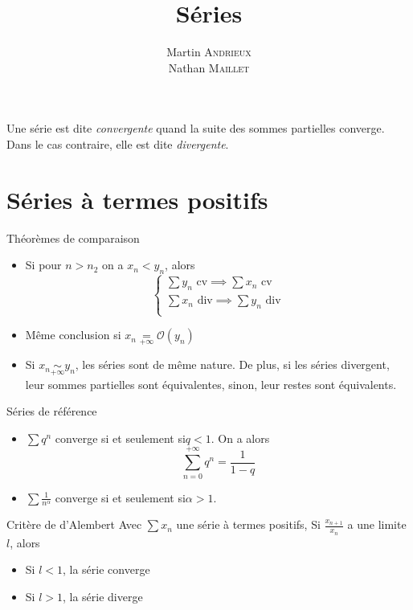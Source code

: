 \documentclass[french, a4paper, 11pt, twocolumn]{article}
\title{Séries}
\author{Martin \textsc{Andrieux} \\
        Nathan \textsc{Maillet}}
\date{}
\newcommand{\ssi}{si et seulement si\xspace}		%
\newcommand{\inv}[1]{\dfrac{1}{#1}}
\begin{document}
\maketitle

\begin{definition}
  Une série est dite \emph{convergente} quand la suite des sommes partielles converge. Dans le cas contraire, elle est dite \emph{divergente}.
\end{definition}

\section{Séries à termes positifs}
\begin{theoreme}{Théorèmes de comparaison}
  \begin{itemize}[label=\(\bullet\)]
    \item Si pour \(n>n_{2}\) on a \(x_{n}<y_{n}\), alors
      \[\begin{cases}
          \sum y_{n} \text{ cv} \implies \sum x_{n} \text{ cv}\\
          \sum x_{n} \text{ div} \implies \sum y_{n} \text{ div}\\
      \end{cases}\]
    \item Même conclusion si \(x_{n} \underset{+\infty}{=} \mathcal{O}(y_{n})\)
    \item Si \(x_{n} \underset{+\infty}{\sim} y_{n}\), les séries sont de même nature. De plus, si les séries divergent, leur sommes partielles sont équivalentes, sinon, leur restes sont équivalents.
  \end{itemize}
\end{theoreme}

\begin{theoreme}{Séries de référence}
  \begin{itemize}[label=\(\bullet\)]
    \item \(\sum q^{n}\) converge \ssi \(q<1\). On a alors
      \[\sum_{n=0}^{+\infty}q^{n} = \inv{1-q}\]
    \item \(\sum \frac{1}{n^{\alpha}}\) converge \ssi\(\alpha > 1\).
  \end{itemize}
\end{theoreme}

\begin{theoreme}{Critère de d'Alembert}
  Avec \(\sum x_{n}\) une série à termes positifs,
  Si \(\frac{x_{n+1}}{x_{n}}\) a une limite \(l\), alors
  \begin{itemize}[label=\(\bullet\)]
    \item Si \(l<1\), la série converge
    \item Si \(l>1\), la série diverge
  \end{itemize}
\end{theoreme}
\end{document}
